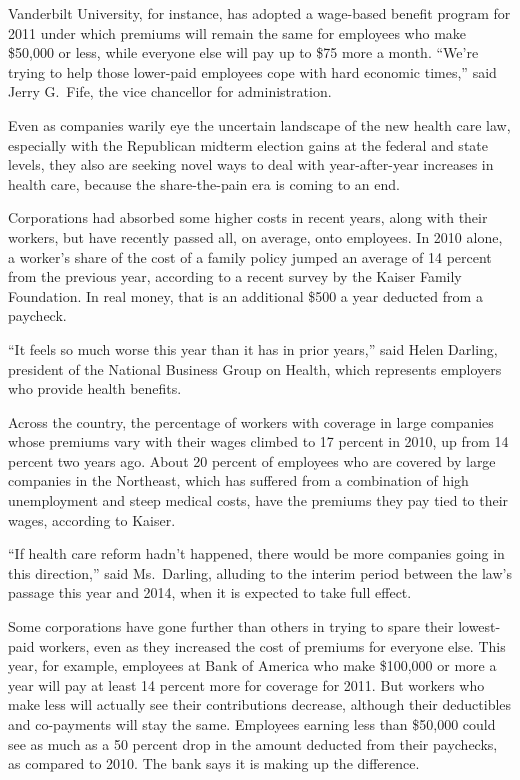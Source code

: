 ﻿\documentclass[12pt]{article}
\begin{document}
Vanderbilt University, for instance, has adopted a wage-based benefit program for 2011 under which
premiums will remain the same for employees who make \$50,000 or less, while everyone else will pay
up to \$75 more a month. ``We're trying to help those lower-paid employees cope with hard economic
times,'' said Jerry G.~Fife, the vice chancellor for administration.

Even as companies warily eye the uncertain landscape of the new health care law, especially with the
Republican midterm election gains at the federal and state levels, they also are seeking novel ways
to deal with year-after-year increases in health care, because the share-the-pain era is coming to
an end.

Corporations had absorbed some higher costs in recent years, along with their workers, but have
recently passed all, on average, onto employees. In 2010 alone, a worker's share of the cost of a
family policy jumped an average of 14 percent from the previous year, according to a recent survey
by the Kaiser Family Foundation. In real money, that is an additional \$500 a year deducted from a
paycheck.

``It feels so much worse this year than it has in prior years,'' said Helen Darling, president of
the National Business Group on Health, which represents employers who provide health benefits.

Across the country, the percentage of workers with coverage in large companies whose premiums vary
with their wages climbed to 17 percent in 2010, up from 14 percent two years ago. About 20 percent
of employees who are covered by large companies in the Northeast, which has suffered from a
combination of high unemployment and steep medical costs, have the premiums they pay tied to their
wages, according to Kaiser.

``If health care reform hadn't happened, there would be more companies going in this direction,''
said Ms.~Darling, alluding to the interim period between the law's passage this year and 2014, when
it is expected to take full effect.

Some corporations have gone further than others in trying to spare their lowest-paid workers, even
as they increased the cost of premiums for everyone else. This year, for example, employees at Bank
of America who make \$100,000 or more a year will pay at least 14 percent more for coverage for
2011. But workers who make less will actually see their contributions decrease, although their
deductibles and co-payments will stay the same. Employees earning less than \$50,000 could see as
much as a 50 percent drop in the amount deducted from their paychecks, as compared to 2010. The bank
says it is making up the difference.
\end{document}
